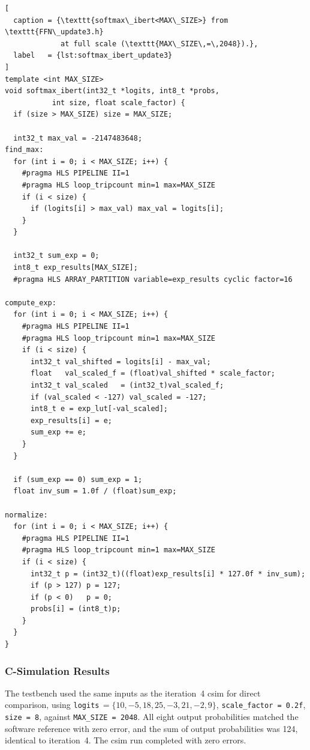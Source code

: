 \begin{lstlisting}[
  caption = {\texttt{softmax\_ibert<MAX\_SIZE>} from \texttt{FFN\_update3.h}
             at full scale (\texttt{MAX\_SIZE\,=\,2048}).},
  label   = {lst:softmax_ibert_update3}
]
template <int MAX_SIZE>
void softmax_ibert(int32_t *logits, int8_t *probs,
           int size, float scale_factor) {
  if (size > MAX_SIZE) size = MAX_SIZE;

  int32_t max_val = -2147483648;
find_max:
  for (int i = 0; i < MAX_SIZE; i++) {
    #pragma HLS PIPELINE II=1
    #pragma HLS loop_tripcount min=1 max=MAX_SIZE
    if (i < size) {
      if (logits[i] > max_val) max_val = logits[i];
    }
  }

  int32_t sum_exp = 0;
  int8_t exp_results[MAX_SIZE];
  #pragma HLS ARRAY_PARTITION variable=exp_results cyclic factor=16

compute_exp:
  for (int i = 0; i < MAX_SIZE; i++) {
    #pragma HLS PIPELINE II=1
    #pragma HLS loop_tripcount min=1 max=MAX_SIZE
    if (i < size) {
      int32_t val_shifted = logits[i] - max_val;
      float   val_scaled_f = (float)val_shifted * scale_factor;
      int32_t val_scaled   = (int32_t)val_scaled_f;
      if (val_scaled < -127) val_scaled = -127;
      int8_t e = exp_lut[-val_scaled];
      exp_results[i] = e;
      sum_exp += e;
    }
  }

  if (sum_exp == 0) sum_exp = 1;
  float inv_sum = 1.0f / (float)sum_exp;

normalize:
  for (int i = 0; i < MAX_SIZE; i++) {
    #pragma HLS PIPELINE II=1
    #pragma HLS loop_tripcount min=1 max=MAX_SIZE
    if (i < size) {
      int32_t p = (int32_t)((float)exp_results[i] * 127.0f * inv_sum);
      if (p > 127) p = 127;
      if (p < 0)   p = 0;
      probs[i] = (int8_t)p;
    }
  }
}
\end{lstlisting}

\subsubsection{C-Simulation Results}
\label{subsubsec:softmax_ibert_update3_csim}

The testbench used the same inputs as the iteration~4 csim for direct
comparison, using \texttt{logits}\,$=\{10, -5, 18, 25, -3, 21, -2, 9\}$,
\texttt{scale\_factor\,=\,0.2f}, \texttt{size\,=\,8}, against
\texttt{MAX\_SIZE\,=\,2048}. All eight output probabilities matched the
software reference with zero error, and the sum of output probabilities
was 124, identical to iteration~4. The csim run completed with zero errors.

